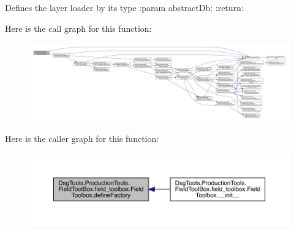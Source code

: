 \begin{DoxyVerb}Defines the layer loader by its type
:param abstractDb:
:return:
\end{DoxyVerb}
 Here is the call graph for this function\+:
\nopagebreak
\begin{figure}[H]
\begin{center}
\leavevmode
\includegraphics[width=350pt]{class_dsg_tools_1_1_production_tools_1_1_field_tool_box_1_1field__toolbox_1_1_field_toolbox_a6c2f8a2403ed6d0283fba1c7b5e1a602_cgraph}
\end{center}
\end{figure}
Here is the caller graph for this function\+:
\nopagebreak
\begin{figure}[H]
\begin{center}
\leavevmode
\includegraphics[width=350pt]{class_dsg_tools_1_1_production_tools_1_1_field_tool_box_1_1field__toolbox_1_1_field_toolbox_a6c2f8a2403ed6d0283fba1c7b5e1a602_icgraph}
\end{center}
\end{figure}
\mbox{\label{class_dsg_tools_1_1_production_tools_1_1_field_tool_box_1_1field__toolbox_1_1_field_toolbox_a3b496b3d89e2edda903714b1485a50d4}} 
